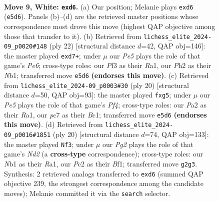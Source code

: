 \documentclass[11pt]{article}
\begin{document}
\clearpage

\begin{figure}[p]\centering
\begin{subfigure}{0.46\textwidth}\centering
\resizebox{\linewidth}{!}{%
\newchessgame
\chessboard[
  setfen={r1b1kb1r/p1p1qppp/2pp4/3nP3/8/5P2/PPP1Q1PP/RNB1KB1R w KQkq - 0 9},
  showmover=false,
  pgfstyle=straightmove, color=movearrow, markmove={e5-d6}
]}
\caption{}
\end{subfigure}\hfill
\begin{subfigure}{0.46\textwidth}\centering
\resizebox{\linewidth}{!}{%
\newchessgame
\chessboard[
  setfen={r3kb1r/2ppq1pp/bnp1Pp2/p7/2P4P/6P1/PP2QP2/RNB1KB1R w KQkq - 1 12},
  showmover=false,
  pgfstyle=straightmove, color=movearrow, markmove={e6-d7}
]}
\caption{}
\end{subfigure}
\\[4pt]
\begin{subfigure}{0.46\textwidth}\centering
\resizebox{\linewidth}{!}{%
\newchessgame
\chessboard[
  setfen={r3kb1r/p1ppqp1p/b1p5/3nP1p1/2P2P2/1P6/P3Q1PP/RNB1KB1R w KQkq - 0 11},
  showmover=false,
  pgfstyle=straightmove, color=movearrow, markmove={f4-g5}
]}
\caption{}
\end{subfigure}\hfill
\begin{subfigure}{0.46\textwidth}\centering
\resizebox{\linewidth}{!}{%
\newchessgame
\chessboard[
  setfen={r1b1kb1r/p1p2ppp/2ppq3/4P3/1nP4P/8/PP1NQPP1/R1B1KB1R w KQkq - 1 11},
  showmover=false,
  pgfstyle=straightmove, color=movearrow, markmove={d2-f3}
]}
\caption{}
\end{subfigure}
\caption{\textbf{Move 9, White: \texttt{exd6}.} (a) Our position; Melanie plays \texttt{exd6} (\texttt{e5d6}). Panels (b)--(d) are the retrieved master positions whose correspondence most drove this move (highest QAP objective among those that transfer to it). (b) Retrieved from \texttt{lichess\_elite\_2024-09\_p0020\#148} (ply 22) [structural distance $d$=42, QAP obj=146]: the master played \texttt{exd7+}; under $\mu$ our \emph{Pe5} plays the role of that game's \emph{Pe6}; cross-type roles: our \emph{P}f3 as their \emph{R}a1, our \emph{P}h2 as their \emph{N}b1; transferred move \texttt{e5d6} \textbf{(endorses this move)}. (c) Retrieved from \texttt{lichess\_elite\_2024-09\_p0003\#30} (ply 20) [structural distance $d$=50, QAP obj=93]: the master played \texttt{fxg5}; under $\mu$ our \emph{Pe5} plays the role of that game's \emph{Pf4}; cross-type roles: our \emph{P}a2 as their \emph{R}a1, our \emph{p}c7 as their \emph{B}c1; transferred move \texttt{e5d6} \textbf{(endorses this move)}. (d) Retrieved from \texttt{lichess\_elite\_2024-09\_p0016\#1851} (ply 20) [structural distance $d$=74, QAP obj=133]: the master played \texttt{Nf3}; under $\mu$ our \emph{Pg2} plays the role of that game's \emph{Nd2} (a \textbf{cross-type} correspondence); cross-type roles: our \emph{N}b1 as their \emph{R}a1, our \emph{P}c2 as their \emph{B}f1; transferred move \texttt{g2g3}. Synthesis: 2 retrieved analogs transferred to \texttt{exd6} (summed QAP objective 239, the strongest correspondence among the candidate moves); Melanie committed it via the \texttt{search} selector.}
\label{fig:thought-m16}
\end{figure}
\end{document}
